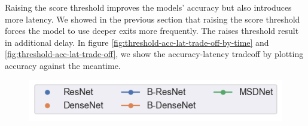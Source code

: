 Raising the score threshold improves the models' accuracy but also introduces more latency. We showed in the previous section that raising the score threshold forces the model to use deeper exits more frequently. The raises threshold result in additional delay. In figure \ref{fig:threshold-acc-lat-trade-off-by-time} and \ref{fig:threshold-acc-lat-trade-off}, we show the accuracy-latency tradeoff by plotting accuracy against the meantime.
\begin{figure}
	\captionsetup[subfigure]{justification=centering,farskip=0pt,captionskip=0pt}
	\centering
	\includegraphics[width=.4\linewidth]{figures/threshold_plots/inference_by_time_legend}
	\hfill
	\hfill

\end{figure}
